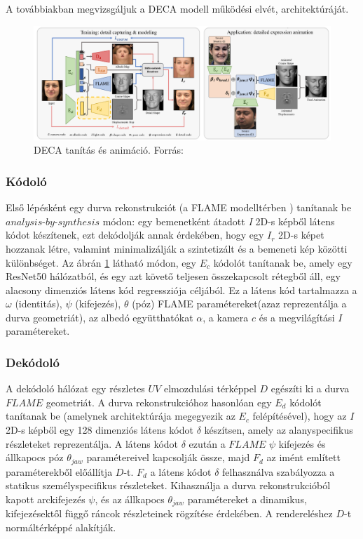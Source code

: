 \documentclass[12pt,a4]{article}
\begin{document}
 	A továbbiakban megvizsgáljuk a DECA modell működési elvét, architektúráját.
 	
 	\begin{figure}[h]	
 		\centering
 		\includegraphics[width=1\linewidth]{deca}
 		\caption{ DECA tanítás és animáció.
 			Forrás:\cite{deca}}
        \label{fig:deca}
 	\end{figure}
 	
	 \subsubsection{Kódoló}
	 Első lépésként egy durva rekonstrukciót (a FLAME modelltérben \cite{flame}) tanítanak be $analysis$-$by$-$synthesis$ módon: egy bemenetként átadott \textit{I} 2D-s képből látens kódot készítenek, ezt dekódolják annak érdekében, hogy egy $I_{r}$ 2D-s képet hozzanak létre, valamint minimalizálják a szintetizált és a bemeneti kép közötti különbséget.
	 Az ábrán \ref{fig:deca} látható módon, egy $E_{c}$ kódolót tanítanak be, amely egy ResNet50 \cite{liwen} hálózatból, és egy azt követő teljesen összekapcsolt rétegből áll, egy alacsony dimenziós látens kód regressziója céljából. Ez a látens kód tartalmazza a $\omega$ (identitás), $\psi$ (kifejezés), $\theta$ (póz) FLAME \cite{flame} paramétereket(azaz reprezentálja a durva geometriát), az albedó együtthatókat $\alpha$, a kamera $c$ és a megvilágítási $I$ paramétereket.\\
	 
 \subsubsection{Dekódoló}
 	 
 	A dekódoló hálózat egy részletes $UV$ elmozdulási térképpel $D$ egészíti
 	ki a durva $FLAME$ geometriát. A durva rekonstrukcióhoz hasonlóan
 	egy $E_{d}$ kódolót tanítanak be (amelynek architektúrája megegyezik az $E_{c}$
 	felépítésével), hogy az $I$ 2D-s képből egy 128 dimenziós látens kódot $\delta$
 	készítsen, amely az alanyspecifikus részleteket reprezentálja. A látens kódot $\delta$
 	ezután a $FLAME$ $\psi$ kifejezés és állkapocs póz $\theta_{jaw}$ paramétereivel kapcsolják
 	össze, majd $F_{d}$ az imént említett paraméterekből előállítja $D$-t. $F_{d}$ a látens kódot $\delta$ felhasználva szabályozza a statikus személyspecifikus részleteket. Kihasználja a durva rekonstrukcióból kapott arckifejezés $\psi$, és az állkapocs $\theta_{jaw}$ paramétereket a dinamikus, kifejezésektől függő ráncok részleteinek rögzítése érdekében. A rendereléshez $D$-t normáltérképpé alakítják.
 	 
\end{document}
